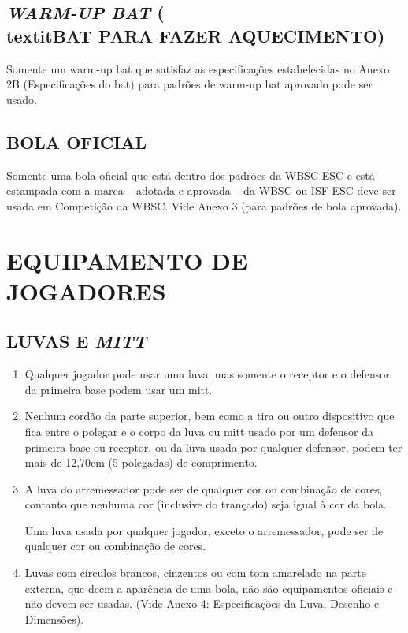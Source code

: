 \subsection{\textit{WARM-UP BAT} (\\textit{BAT} PARA FAZER AQUECIMENTO)}
Somente um \gls{warm-up bat} que satisfaz as especificações estabelecidas no Anexo 2B (Especificações do \gls{bat}) para padrões de \gls{warm-up bat} aprovado pode ser usado.

\subsection{BOLA OFICIAL}
Somente uma bola oficial que está dentro dos padrões da WBSC \gls{ESC} e está estampada com a marca -- adotada e aprovada -- da WBSC ou ISF \gls{ESC} deve ser usada em Competição da WBSC. Vide Anexo 3 (para padrões de bola aprovada).

\section{EQUIPAMENTO DE JOGADORES}

\subsection{LUVAS E \textit{MITT}}

\begin{enumerate}[label=(\alph*)]\item   Qualquer jogador pode usar uma luva, mas somente o receptor e o defensor  da primeira base podem usar um \gls{mitt}.
	\item  Nenhum cordão da parte superior, bem como a tira ou outro dispositivo que  fica entre o polegar e o corpo da luva ou \gls{mitt} usado por um defensor da primeira   base ou receptor, ou da luva usada por qualquer defensor, podem ter mais de  12,70cm (5 polegadas) de comprimento.
	\item  A luva do arremessador pode ser de qualquer cor ou combinação de cores, contanto que nenhuma cor (inclusive do trançado) seja igual à cor da bola.

	Uma  luva usada por qualquer jogador, exceto o arremessador, pode ser de qualquer cor ou combinação de cores.

	\item  Luvas com círculos brancos, cinzentos ou com tom amarelado na parte externa, que deem a aparência de uma bola, não são equipamentos oficiais e não devem ser usadas. (Vide Anexo 4: Especificações da Luva, Desenho e Dimensões).
\end{enumerate}


